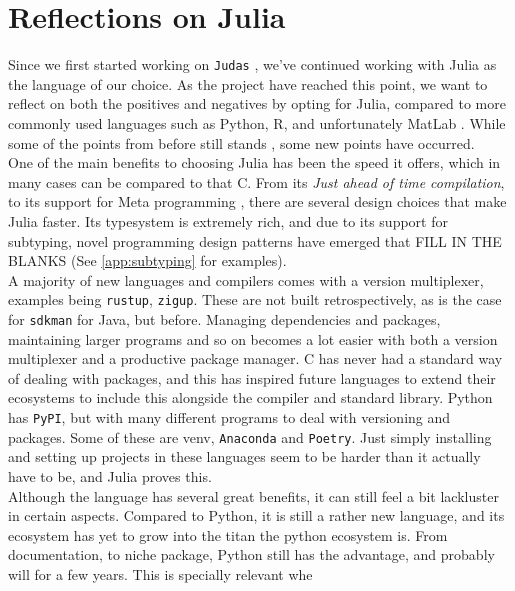 \section*{Reflections on Julia}
\label{sec:juliaref}

Since we first started working on \texttt{Judas} \cite{projthesis}, we've continued working with Julia as the language of our choice. As the project have reached this point, we want to reflect on both the positives and negatives by opting for Julia, compared to more commonly used languages such as Python, R, and unfortunately MatLab \cite{matlabpyr}. While some of the points from before still stands \cite{projthesis}, some new points have occurred. \\

One of the main benefits to choosing Julia has been the speed it offers, which in many cases can be compared to that C. From its \textit{Just ahead of time compilation}, to its support for Meta programming \cite{whyjulia} \cite{julia}, there are several design choices that make Julia faster. Its typesystem is extremely rich, and due to its support for subtyping, novel programming design patterns have emerged that FILL IN THE BLANKS (See \ref{app:subtyping} for examples). \\ 

A majority of new languages and compilers comes with a version multiplexer, examples being \texttt{rustup}, \texttt{zigup}. These are not built retrospectively, as is the case for \texttt{sdkman} for Java, but before. Managing dependencies and packages, maintaining larger programs and so on becomes a lot easier with both a version multiplexer and a productive package manager. C has never had a standard way of dealing with packages, and this has inspired future languages to extend their ecosystems to include this alongside the compiler and standard library. Python has \texttt{PyPI}, but with many different programs to deal with versioning and packages. Some of these are venv, \texttt{Anaconda} and \texttt{Poetry}. Just simply installing and setting up projects in these languages seem to be harder than it actually have to be, and Julia proves this. \\ 


Although the language has several great benefits, it can still feel a bit lackluster in certain aspects. Compared to Python, it is still a rather new language, and its ecosystem has yet to grow into the titan the python ecosystem is. From documentation, to niche package, Python still has the advantage, and probably will for a few years. This is specially relevant whe \\




